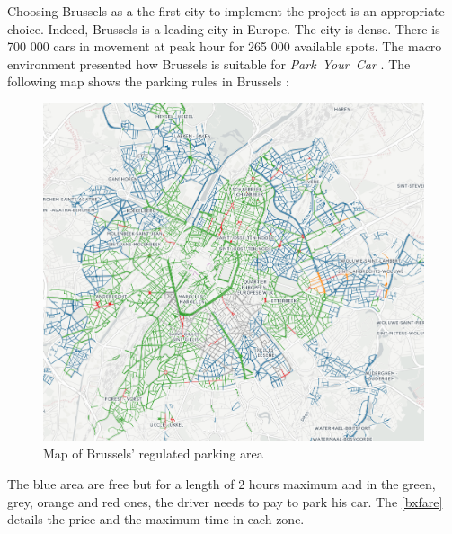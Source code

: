 \documentclass[12pt,a4paper,oneside]{book}
\newcommand{\bp}{\textit{Park~Your~Car }}
\begin{document}
Choosing Brussels as a the first city to implement the project is an appropriate choice. Indeed, Brussels is a leading city in Europe. The city is dense. There is 700 000 cars in movement at peak hour for 265 000 available spots.\cite{parkbx} The macro environment presented how Brussels is suitable for \bp. The following map shows the parking rules in Brussels\cite{parkbx} : \\

\begin{figure}[h]
\centering
\caption{Map of Brussels' regulated parking area}
\label{bxmap}
\includegraphics[keepaspectratio=true,width=\textwidth-2cm]{images/bxpark.png}
\end{figure}


The blue area are free but for a length of 2 hours maximum and in the green, grey, orange and red ones, the driver needs to pay to park his car. The \autoref{bxfare} details the price and the maximum time in each zone.\\
\end{document}
